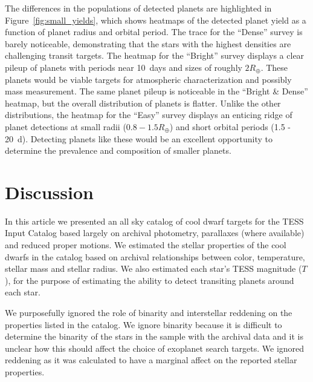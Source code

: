 \documentclass[twocolumn]{aastex62}
\begin{document}
The differences in the populations of detected planets are highlighted in Figure~\ref{fig:small_yields}, which shows heatmaps of the detected planet yield as a function of planet radius and orbital period. The trace for the ``Dense'' survey is barely noticeable, demonstrating that the stars with the highest densities are challenging transit targets. The heatmap for the ``Bright'' survey displays a clear pileup of planets with periods near 10~days and sizes of roughly $2 R_\oplus$. These planets would be viable targets for atmospheric characterization and possibly mass measurement. The same planet pileup is noticeable in the ``Bright \& Dense'' heatmap, but the overall distribution of planets is flatter. Unlike the other distributions, the heatmap for the ``Easy'' survey displays an enticing ridge of planet detections at small radii ($0.8-1.5 R_\oplus$) and short orbital periods (1.5 - 20~d). Detecting planets like these would be an excellent opportunity to determine the prevalence and composition of smaller planets.   








\section{Discussion}\label{sec:discussion}

In this article we presented an all sky catalog of cool dwarf targets for the TESS Input Catalog based largely on archival photometry, parallaxes (where available) and reduced proper motions.  We estimated the stellar properties of the cool dwarfs in the catalog based on archival relationships between color, temperature, stellar mass and stellar radius.  We also estimated each star's TESS magnitude ($T$), for the purpose of estimating the ability to detect transiting planets around each star.

We purposefully ignored the role of binarity and interstellar reddening on the properties listed in the catalog.  We ignore binarity because it is difficult to determine the binarity of the stars in the sample with the archival data and it is unclear how this should affect the choice of exoplanet search targets.  We ignored reddening as it was calculated to have a marginal affect on the reported stellar properties. 
\end{document}
